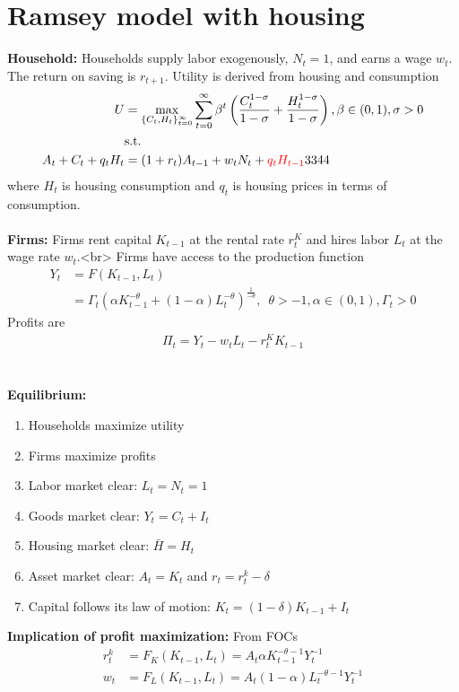 \documentclass{article}
\begin{document}
\section{Ramsey model with housing}
\textbf{Household:} Households supply labor exogenously, $N_{t}=1$, and earns a wage $w_{t}$. The return on saving is $r_{t+1}$. Utility is derived from housing and consumption
$$
\begin{aligned}
	U & =\max_{\{C_{t},H_{t}\}_{t=0}^{\infty}}\sum_{t=0}^{\infty}\beta^{t}\left(\frac{C_{t}^{1-\sigma}}{1-\sigma}+\frac{H_{t}^{1-\sigma}}{1-\sigma}\right),\beta\in(0,1),\sigma>0\\
	& \text{s.t.}\\
	A_{t}+C_t+q_tH_t& =(1+r_{t})A_{t-1}+w_{t}N_{t} +  \color{red}q_{t}H_{t-1} \color{black}{33}44
\end{aligned}
$$
where $H_{t}$ is housing consumption and $q_{t}$ is housing prices in terms of consumption. 
\\\\
\textbf{Firms:} Firms rent capital $K_{t-1}$ at the rental rate $r_{t}^{K}$
and hires labor $L_{t}$ at the wage rate $w_{t}$.<br>
Firms have access to the production function
$$
\begin{aligned}
	Y_{t} &= F(K_{t-1},L_{t}) \\ &=\Gamma_t(\alpha K_{t-1}^{-\theta}+(1-\alpha)L_{t}^{-\theta})^{\frac{1}{-\theta}},\,\,\,\theta>-1,\alpha\in(0,1),\Gamma_t>0
\end{aligned}
$$
Profits are
$$
\begin{aligned}
	\Pi_{t}=Y_{t}-w_{t}L_{t}-r_{t}^{K}K_{t-1}
\end{aligned}
$$
\\\\
\textbf{Equilibrium:}
\begin{enumerate}
	\item Households maximize utility
	\item Firms maximize profits 
	\item Labor market clear: $L_{t}=N_{t}=1$
	\item Goods market clear: $Y_{t}=C_{t}+I_{t}$
	\item Housing market clear: $\bar{H}=H_t$
	\item Asset market clear: $A_{t}=K_{t}$ and $r_{t}=r_{t}^{k}-\delta$
	\item Capital follows its law of motion: $K_{t}=(1-\delta)K_{t-1}+I_{t}$
\end{enumerate}
\textbf{Implication of profit maximization:} From FOCs
$$
\begin{aligned}
	r_{t}^{k} & = F_{K}(K_{t-1},L_{t})=A_t \alpha K_{t-1}^{-\theta-1}Y_{t}^{-1}\\
	w_{t} & = F_{L}(K_{t-1},L_{t})=A_t (1-\alpha)L_{t}^{-\theta-1}Y_{t}^{-1}
\end{aligned}
$$
\end{document}
